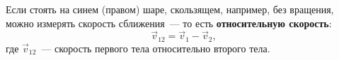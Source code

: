 \documentclass[main.tex]{subfiles}
\begin{document}

%     



Если стоять на синем (правом) шаре, скользящем, например, без вращения, можно измерять скорость сближения~--- то есть \textbf{относительную скорость}: 
\begin{equation}
    \vec v_{12}=\vec v_{1}-\vec v_{2},
\end{equation}
где $\vec v_\text{12}$~--- скорость первого тела относительно второго тела.





 
\end{document}
